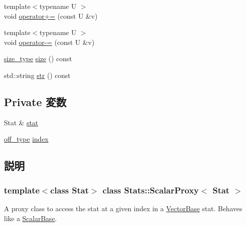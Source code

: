 \begin{DoxyCompactItemize}
{\footnotesize template$<$typename U $>$ }\\void \hyperlink{classStats_1_1ScalarProxy_a057ed2b8eaf6c5c5bad1c143d8449cb6}{operator+=} (const U \&v)
\item 
{\footnotesize template$<$typename U $>$ }\\void \hyperlink{classStats_1_1ScalarProxy_a7f5bf4b1be35c726f936b48640ee3b4b}{operator-\/=} (const U \&v)
\item 
\hyperlink{namespaceStats_ada51e68d31936547d3729c82daf6b7c6}{size\_\-type} \hyperlink{classStats_1_1ScalarProxy_a503ab01f6c0142145d3434f6924714e7}{size} () const 
\item 
std::string \hyperlink{classStats_1_1ScalarProxy_a1b9b8885b0880fc4ddf9a2c7d1ca3dc4}{str} () const 
\end{DoxyCompactItemize}
\subsection*{Private 変数}
\begin{DoxyCompactItemize}
\item 
Stat \& \hyperlink{classStats_1_1ScalarProxy_a7fee3822515c4dc6b8b99a8bf35fa6b8}{stat}
\item 
\hyperlink{namespaceStats_a2773c9fa9e4b0b04a46b37494b44842a}{off\_\-type} \hyperlink{classStats_1_1ScalarProxy_a9707c4a1627041aeffc05da26c91acff}{index}
\end{DoxyCompactItemize}


\subsection{説明}
\subsubsection*{template$<$class Stat$>$ class Stats::ScalarProxy$<$ Stat $>$}

A proxy class to access the stat at a given index in a \hyperlink{classStats_1_1VectorBase}{VectorBase} stat. Behaves like a \hyperlink{classStats_1_1ScalarBase}{ScalarBase}. 

